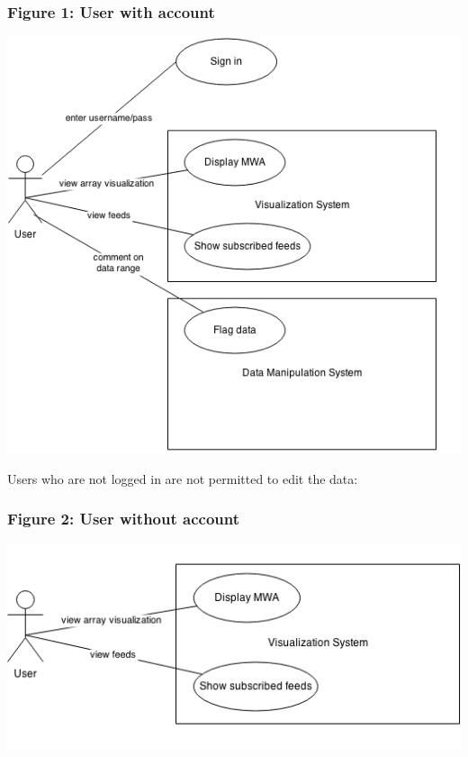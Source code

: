 \documentclass[12pt]{article}
\begin{document}
\begin{spacing}{1.5}
\subsubsection{Figure 1: User with account}
\begin{center}
\includegraphics{usecase1} %
\end{center}
\newpage
Users who are not logged in are not permitted to edit the data:
\subsubsection{Figure 2: User without account}
\begin{center}
\includegraphics{usecase2}
\end{center}


\end{spacing}
\end{document}
